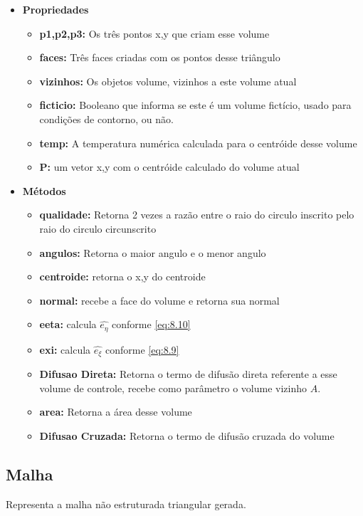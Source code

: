 \begin{itemize}
    \item \textbf{Propriedades}
    \begin{itemize}
        \item \textbf{p1,p2,p3:} Os três pontos x,y que criam esse volume
        \item \textbf{faces:} Três faces criadas com os pontos desse triângulo
        \item \textbf{vizinhos:} Os objetos volume, vizinhos a este volume atual
        \item \textbf{ficticio:} Booleano que informa se este é um volume fictício, usado para condições de contorno, ou não.
        \item \textbf{temp:} A temperatura numérica calculada para o centróide desse volume
        \item \textbf{P:} um vetor x,y com o centróide calculado do volume atual
    \end{itemize}
    \item \textbf{Métodos}
    \begin{itemize}
        \item \textbf{qualidade:} Retorna 2 vezes a razão entre o raio do circulo inscrito pelo raio do circulo circunscrito
        \item \textbf{angulos:} Retorna o maior angulo e o menor angulo
        \item \textbf{centroide:} retorna o x,y do centroide
        \item \textbf{normal:} recebe a face do volume e retorna sua normal
        \item \textbf{eeta:} calcula $\hat{e_\eta}$ conforme \ref{eq:8.10}
        \item \textbf{exi:} calcula $\hat{e_\xi}$ conforme \ref{eq:8.9}
        \item \textbf{Difusao Direta:} Retorna o termo de difusão direta referente a esse volume de controle, recebe como parâmetro o volume vizinho $A$.
        \item \textbf{area:} Retorna a área desse volume
        \item \textbf{Difusao Cruzada:} Retorna o termo de difusão cruzada do volume
    \end{itemize}
\end{itemize}

\subsection{Malha}
Representa a malha não estruturada triangular gerada.

